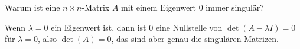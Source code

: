 Warum ist eine $n\times n$-Matrix $A$ mit einem Eigenwert 0
immer singulär?


\begin{loesung}
Wenn $\lambda=0$ ein Eigenwert ist, dann ist $0$ eine Nullstelle
von $\det(A-\lambda I)=0$ für $\lambda=0$, also $\det(A)=0$,
das sind aber genau die singulären Matrizen.
\end{loesung}

